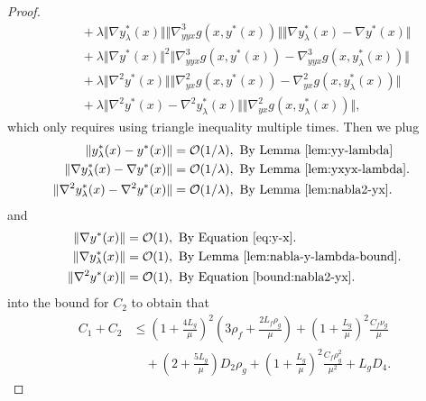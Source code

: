 \begin{proof}
\begin{align*}
    &\quad + \lambda \Vert \nabla y_{\lambda}^*(x) \Vert \Vert \nabla_{yyx}^3 g(x,y^*(x)) \Vert  \Vert \nabla y_{\lambda}^*(x) - \nabla y^*(x) \Vert \\
    &\quad + \lambda \Vert \nabla y^*(x) \Vert^2 \Vert \nabla_{yyx}^3 g(x,y^*(x)) - \nabla_{yyx}^3 g(x,y_{\lambda}^*(x)) \Vert \\
    &\quad + \lambda \Vert \nabla^2 y^*(x) \Vert \Vert \nabla_{yx}^2 g(x,y^*(x)) - \nabla_{yx}^2 g(x,y_{\lambda}^*(x)) \Vert \\
    &\quad + \lambda \Vert \nabla^2 y^*(x) - \nabla^2 y_{\lambda}^*(x) \Vert  \Vert \nabla_{yx}^2 g(x,y_{\lambda}^*(x)) \Vert,
\end{align*}
{which only requires using triangle inequality multiple times. Then we plug
\begin{align} \label{eq:lambda}
\begin{split} 
            \Vert y_{\lambda}^*(x) - y^*(x) \Vert &= {\mathcal{O}}(1/\lambda), \text{ By Lemma \ref{lem:yy-lambda} } \\
        \Vert \nabla y_{\lambda}^*(x) - \nabla y^*(x) \Vert &= {\mathcal{O}}(1/\lambda), \text{ By Lemma \ref{lem:yxyx-lambda}. } \\
        \Vert \nabla^2 y_{\lambda}^*(x) - \nabla^2 y^*(x) \Vert &= {\mathcal{O}}(1/\lambda), \text{ By Lemma \ref{lem:nabla2-yx}.}
\end{split}
\end{align}
and
\begin{align} \label{eq:1}
\begin{split}
        \Vert \nabla y^*(x) \Vert &= \fO(1) , \text{ By \Eqref{eq:y-x}.} \\
    \Vert \nabla y_{\lambda}^*(x) \Vert &= \fO(1), \text{ By Lemma \ref{lem:nabla-y-lambda-bound}}. \\
    \Vert \nabla^2 y^*(x) \Vert &= \fO(1), \text{ By \Eqref{bound:nabla2-yx}}.
\end{split}
\end{align}
into the bound for $C_2$ to obtain that
} 
\begin{align*}
    C_1+C_2 & \le \left( 1 + \frac{4L_g}{\mu} \right)^2 \left( 3\rho_f  + \frac{2 L_f \rho_g}{\mu} \right) + \left(1 + \frac{L_g}{\mu} \right)^2 \frac{C_f \nu_g}{\mu} \\
    &\quad + \left(2+ \frac{5L_g}{\mu} \right) D_2 \rho_g +  \left( 1+ \frac{L_g}{\mu} \right)^2 \frac{C_f \rho_g^2}{\mu^2} + L_g D_4.
\end{align*}
\end{proof}
 
